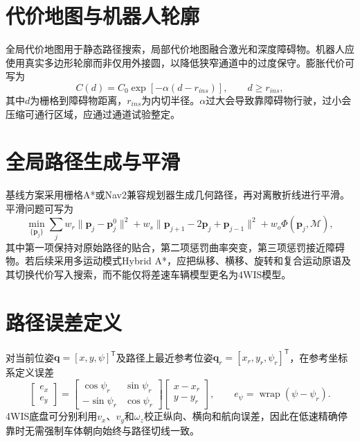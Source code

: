\documentclass[UTF8,openany,12pt,a4paper]{ctexrep}
\newcommand{\trans}{^{\mathsf T}}
\begin{document}
\section{代价地图与机器人轮廓}
全局代价地图用于静态路径搜索，局部代价地图融合激光和深度障碍物。机器人应使用真实多边形轮廓而非仅用外接圆，以降低狭窄通道中的过度保守。膨胀代价可写为
\begin{equation}C(d)=C_0\exp[-\alpha(d-r_{ins})],\qquad d\geq r_{ins},\end{equation}
其中$d$为栅格到障碍物距离，$r_{ins}$为内切半径。$\alpha$过大会导致靠障碍物行驶，过小会压缩可通行区域，应通过通道试验整定。

\section{全局路径生成与平滑}
基线方案采用栅格A*或Nav2兼容规划器生成几何路径，再对离散折线进行平滑。平滑问题可写为
\begin{equation}
\min_{\{\bm p_j\}}\sum_j w_r\|\bm p_j-\bm p_j^0\|^2
+w_s\|\bm p_{j+1}-2\bm p_j+\bm p_{j-1}\|^2+w_o\Phi(\bm p_j,\mathcal M),
\end{equation}
其中第一项保持对原始路径的贴合，第二项惩罚曲率突变，第三项惩罚接近障碍物。若后续采用多运动模式Hybrid A*，应把纵移、横移、旋转和复合运动原语及其切换代价写入搜索，而不能仅将差速车辆模型更名为4WIS模型。

\section{路径误差定义}
对当前位姿$\bm q=[x,y,\psi]\trans$及路径上最近参考位姿$\bm q_r=[x_r,y_r,\psi_r]\trans$，在参考坐标系定义误差
\begin{equation}
\begin{bmatrix}e_x\\e_y\end{bmatrix}
=\begin{bmatrix}\cos\psi_r&\sin\psi_r\\-\sin\psi_r&\cos\psi_r\end{bmatrix}
\begin{bmatrix}x-x_r\\y-y_r\end{bmatrix},\qquad e_\psi=\operatorname{wrap}(\psi-\psi_r).
\end{equation}
4WIS底盘可分别利用$v_x$、$v_y$和$\omega_z$校正纵向、横向和航向误差，因此在低速精确停靠时无需强制车体朝向始终与路径切线一致。
\end{document}
